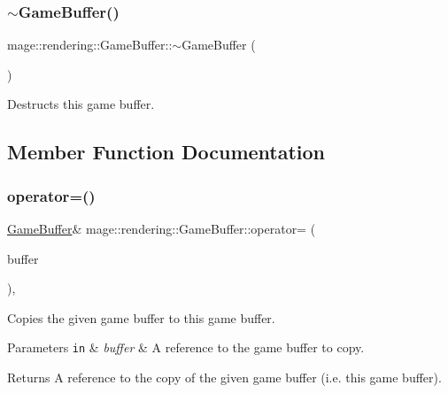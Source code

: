 \subsubsection{\texorpdfstring{$\sim$\+Game\+Buffer()}{~GameBuffer()}}
{\footnotesize\ttfamily mage\+::rendering\+::\+Game\+Buffer\+::$\sim$\+Game\+Buffer (\begin{DoxyParamCaption}{ }\end{DoxyParamCaption})\hspace{0.3cm}{\ttfamily [default]}}

Destructs this game buffer. 

\subsection{Member Function Documentation}
\hypertarget{structmage_1_1rendering_1_1_game_buffer_a44db86bb85f9fcf7dea1345ed9416aa3}{}\label{structmage_1_1rendering_1_1_game_buffer_a44db86bb85f9fcf7dea1345ed9416aa3} 
\subsubsection{\texorpdfstring{operator=()}{operator=()}\hspace{0.1cm}{\footnotesize\ttfamily [1/2]}}
{\footnotesize\ttfamily \hyperlink{structmage_1_1rendering_1_1_game_buffer}{Game\+Buffer}\& mage\+::rendering\+::\+Game\+Buffer\+::operator= (\begin{DoxyParamCaption}\item[{const \hyperlink{structmage_1_1rendering_1_1_game_buffer}{Game\+Buffer} \&}]{buffer }\end{DoxyParamCaption})\hspace{0.3cm}{\ttfamily [default]}, {\ttfamily [noexcept]}}

Copies the given game buffer to this game buffer.


\begin{DoxyParams}[1]{Parameters}
\mbox{\tt in}  & {\em buffer} & A reference to the game buffer to copy. \\
\hline
\end{DoxyParams}
\begin{DoxyReturn}{Returns}
A reference to the copy of the given game buffer (i.\+e. this game buffer). 
\end{DoxyReturn}
\hypertarget{structmage_1_1rendering_1_1_game_buffer_a3fec557a6d2f02eaf2082caa59b5e310}{}\label{structmage_1_1rendering_1_1_game_buffer_a3fec557a6d2f02eaf2082caa59b5e310} 
